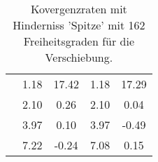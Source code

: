 \begin{table}
\begin{tabular}{c|cc|cc|}
\multicolumn{1}{|c|}{} & \multicolumn{1}{|c|}{      1.18} & \multicolumn{1}{|c|}{     17.42} & \multicolumn{1}{|c|}{      1.18} & \multicolumn{1}{|c|}{     17.29} \\ 
\multicolumn{1}{|c|}{} & \multicolumn{1}{|c|}{      2.10} & \multicolumn{1}{|c|}{      0.26} & \multicolumn{1}{|c|}{      2.10} & \multicolumn{1}{|c|}{      0.04} \\ 
\multicolumn{1}{|c|}{} & \multicolumn{1}{|c|}{      3.97} & \multicolumn{1}{|c|}{      0.10} & \multicolumn{1}{|c|}{      3.97} & \multicolumn{1}{|c|}{     -0.49} \\ 
\multicolumn{1}{|c|}{} & \multicolumn{1}{|c|}{      7.22} & \multicolumn{1}{|c|}{     -0.24} & \multicolumn{1}{|c|}{      7.08} & \multicolumn{1}{|c|}{      0.15} \\ 
\hline 
\end{tabular}\caption{Kovergenzraten mit Hinderniss 'Spitze' mit 162 Freiheitsgraden für die Verschiebung.}\label{tab:Rate_Spitze_level2}
\end{table} 

